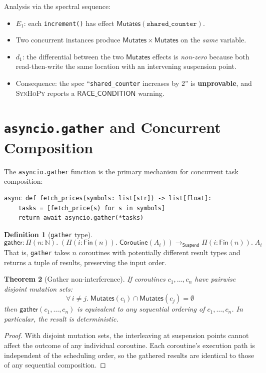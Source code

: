 \documentclass[11pt,a4paper]{report}
\theoremstyle{definition}
\newtheorem{definition}{Definition}[chapter]
\theoremstyle{plain}
\newtheorem{theorem}[definition]{Theorem}
\newcommand{\Nat}{\mathbb{N}}
\newcommand{\Mutates}{\mathsf{Mutates}}
\newcommand{\synhopy}{\textsc{SynHoPy}}
\begin{document}
Analysis via the spectral sequence:
\begin{itemize}
  \item $E_1$: each \texttt{increment()} has effect $\Mutates(\mathtt{shared\_counter})$.
  \item Two concurrent instances produce $\Mutates \times \Mutates$ on the
    \emph{same} variable.
  \item $d_1$: the differential between the two $\Mutates$ effects is
    \emph{non-zero} because both read-then-write the same location with an
    intervening suspension point.
  \item Consequence: the spec ``\texttt{shared\_counter} increases by 2'' is
    \textbf{unprovable}, and \synhopy{} reports a $\mathsf{RACE\_CONDITION}$ warning.
\end{itemize}

\section{\texttt{asyncio.gather} and Concurrent Composition}

The \lstinline[style=python]{asyncio.gather} function is the primary
mechanism for concurrent task composition:

\begin{lstlisting}[style=python]
async def fetch_prices(symbols: list[str]) -> list[float]:
    tasks = [fetch_price(s) for s in symbols]
    return await asyncio.gather(*tasks)
\end{lstlisting}

\begin{definition}[\texttt{gather} type]
\[
  \mathsf{gather} : \Pi(n : \Nat).\;
    \left(\Pi(i : \mathsf{Fin}(n)).\; \mathsf{Coroutine}(A_i)\right)
    \to_{\mathsf{Suspend}} \Pi(i : \mathsf{Fin}(n)).\; A_i
\]
That is, \lstinline[style=python]{gather} takes $n$ coroutines with
potentially different result types and returns a tuple of results,
preserving the input order.
\end{definition}

\begin{theorem}[Gather non-interference]
If coroutines $c_1, \ldots, c_n$ have pairwise disjoint mutation sets:
\[
  \forall\, i \neq j.\; \Mutates(c_i) \cap \Mutates(c_j) = \emptyset
\]
then $\mathsf{gather}(c_1, \ldots, c_n)$ is equivalent to any sequential
ordering of $c_1, \ldots, c_n$.  In particular, the result is
deterministic.
\end{theorem}
\begin{proof}
With disjoint mutation sets, the interleaving at suspension points
cannot affect the outcome of any individual coroutine.  Each coroutine's
execution path is independent of the scheduling order, so the gathered
results are identical to those of any sequential composition.
\end{proof}
\end{document}
